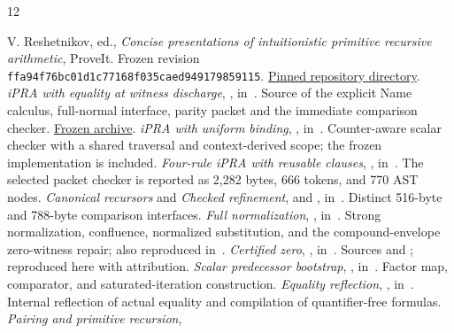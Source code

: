 \documentclass[11pt,letterpaper]{article}
\theoremstyle{definition}\newtheorem{definition}[theorem]{Definition}
\theoremstyle{remark}\newtheorem{remark}[theorem]{Remark}
\begin{document}
\begin{thebibliography}{12}\raggedright
{}
V. Reshetnikov, ed., \emph{Concise presentations of intuitionistic primitive
recursive arithmetic}, ProveIt. Frozen revision
\texttt{ffa94f76bc01d1c77168f035caed949179859115}.
\href{https://github.com/VladimirReshetnikov/ProveIt/tree/ffa94f76bc01d1c77168f035caed949179859115/Logic/PrimitiveRecursiveArithmetic/ConciseIPRA}{Pinned repository directory}.
\emph{iPRA with equality at witness discharge},
,
in~\cite{baseline}. Source of the explicit Name calculus, full-normal
interface, parity packet and the immediate comparison checker.
\href{https://github.com/VladimirReshetnikov/ProveIt/blob/ffa94f76bc01d1c77168f035caed949179859115/Logic/PrimitiveRecursiveArithmetic/ConciseIPRA/docs/incoming/ipra_witness_discharge_2026-11-11.zip}{Frozen archive}.
\emph{iPRA with uniform binding},
,
in~\cite{baseline}. Counter-aware scalar checker with a shared traversal
and context-derived scope; the frozen implementation is included.
\emph{Four-rule iPRA with reusable clauses},
,
in~\cite{baseline}. The selected packet checker is reported as
2,282 bytes, 666 tokens, and 770 AST nodes.
\emph{Canonical recursors} and \emph{Checked refinement},
and ,
in~\cite{baseline}. Distinct 516-byte and 788-byte comparison interfaces.
\emph{Full normalization}, ,
in~\cite{baseline}. Strong normalization, confluence, normalized substitution,
and the compound-envelope zero-witness repair; also reproduced in~\cite{prior}.
\emph{Certified zero}, ,
in~\cite{baseline}. Sources  and
; reproduced here with attribution.
\emph{Scalar predecessor bootstrap},
,
in~\cite{baseline}. Factor map, comparator, and saturated-iteration construction.
\emph{Equality reflection},
,
in~\cite{baseline}. Internal reflection of actual equality and compilation
of quantifier-free formulas.
\emph{Pairing and primitive recursion},

\end{thebibliography}
\end{document}
